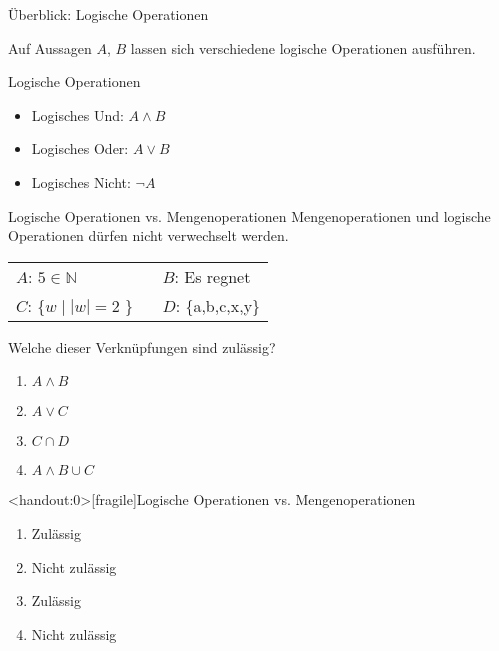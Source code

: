\begin{frame}{Überblick: Logische Operationen}

	Auf \alert{Aussagen} $A$, $B$ lassen sich verschiedene logische Operationen ausführen.

	\begin{exampleblock}{Logische Operationen}
		\begin{itemize}
			\item Logisches Und: $A \wedge B$
			\item Logisches Oder: $A \vee B$
			\item Logisches Nicht: $\neg A$
		\end{itemize}
	\end{exampleblock}
\end{frame}

{
	\begin{frame}{Logische Operationen vs. Mengenoperationen}
		\alert{Mengenoperationen und logische Operationen dürfen nicht verwechselt werden.}
		\begin{table}[]
			\begin{tabular}{l l}
				$A$: $5 \in \mathbb{N}$ & $B$: Es regnet\\
				$C$: \{$w \mid |w|=2$ \} \ & $D$: \{a,b,c,x,y\}\\
			\end{tabular}
		\end{table}
		\begin{block}{Welche dieser Verknüpfungen sind zulässig?}
			\begin{enumerate}
				\item $A \wedge B$
				\item $A \vee C$
				\item $C \cap D$
				\item $A \wedge B \cup C$
			\end{enumerate}
		\end{block}
	\end{frame}
}

{
	\begin{frame}<handout:0>[fragile]{Logische Operationen vs. Mengenoperationen}
		\begin{enumerate}[<+- | alert@+>]
			\item Zulässig
			\item Nicht zulässig
			\item Zulässig
			\item Nicht zulässig
		\end{enumerate}
	\end{frame}
}



